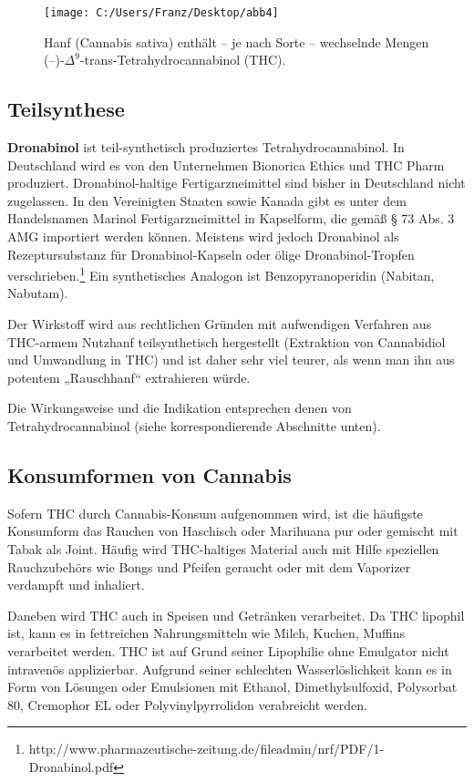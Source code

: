 \documentclass[openany]{scrbook}
\begin{document}
\begin{figure}[h]
	\centering
	\texttt{[image: C:/Users/Franz/Desktop/abb4]}
	\caption{Hanf (Cannabis sativa) enthält – je nach Sorte – wechselnde Mengen (–)-$\Delta^9$-trans-Tetrahydrocannabinol (THC).}
	\label{fig:Cannabis_sativa}
	\end{figure}
	
\subsection{Teilsynthese}
		\textbf{Dronabinol} ist teil-synthetisch produziertes Tetrahydrocannabinol. In Deutschland wird es von den Unternehmen Bionorica Ethics und THC Pharm produziert. Dronabinol-haltige Fertigarzneimittel sind bisher in Deutschland nicht zugelassen. In den Vereinigten Staaten sowie Kanada gibt es unter dem Handelsnamen Marinol Fertigarzneimittel in Kapselform, die gemäß § 73 Abs. 3 AMG importiert werden können. Meistens wird jedoch Dronabinol als Rezeptursubstanz für Dronabinol-Kapseln oder ölige Dronabinol-Tropfen verschrieben.\footnote[4]{http://www.pharmazeutische-zeitung.de/fileadmin/nrf/PDF/1-Dronabinol.pdf} Ein synthetisches Analogon ist Benzopyranoperidin (Nabitan, Nabutam).
		
		Der Wirkstoff wird aus rechtlichen Gründen mit aufwendigen Verfahren aus THC-armem Nutzhanf teilsynthetisch hergestellt (Extraktion von Cannabidiol und Umwandlung in THC) und ist daher sehr viel teurer, als wenn man ihn aus potentem „Rauschhanf“ extrahieren würde.
		
		Die Wirkungsweise und die Indikation entsprechen denen von Tetrahydrocannabinol (siehe korrespondierende Abschnitte unten).
		
\subsection{Konsumformen von Cannabis}
	Sofern THC durch Cannabis-Konsum aufgenommen wird, ist die häufigste Konsumform das Rauchen von Haschisch oder Marihuana pur oder gemischt mit Tabak als Joint. Häufig wird THC-haltiges Material auch mit Hilfe speziellen Rauchzubehörs wie Bongs und Pfeifen geraucht oder mit dem Vaporizer verdampft und inhaliert.
	
	Daneben wird THC auch in Speisen und Getränken verarbeitet. Da THC lipophil ist, kann es in fettreichen Nahrungsmitteln wie Milch, Kuchen, Muffins verarbeitet werden. THC ist auf Grund seiner Lipophilie ohne Emulgator nicht intravenös applizierbar. Aufgrund seiner schlechten Wasserlöslichkeit kann es in Form von Lösungen oder Emulsionen mit Ethanol, Dimethylsulfoxid, Polysorbat 80, Cremophor EL oder Polyvinylpyrrolidon verabreicht werden.
	
\end{document}
